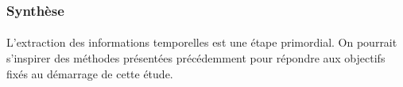 \documentclass[12pt,a4	]{report}
\begin{document}
\subsubsection*{Synthèse}
\paragraph{}
L'extraction des informations temporelles est une étape primordial. On pourrait s'inspirer des méthodes présentées précédemment pour répondre aux objectifs fixés au démarrage de cette étude.


\end{document}
